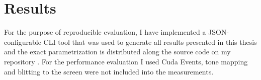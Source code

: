 \chapter{Results}
\label{chap:results}

For the purpose of reproducible evaluation, I have implemented a JSON-configurable CLI tool that was used to generate all results presented in this thesis and the exact parametrization is distributed along the source code on my repository .
For the performance evaluation I used Cuda Events, tone mapping and blitting to the screen were not included into the measurements.